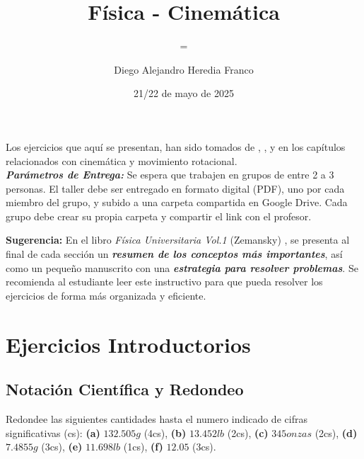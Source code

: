 \documentclass{replab}
\title{Física - Cinemática}
\author{Diego Alejandro Heredia Franco}
\date{21/22 de mayo de 2025}
\subtitle={Taller Calificable 1}
\begin{document}
\setlength{\parindent}{0pt}
	
	\pagestyle{fancy}
	\unspacedoperators
	
	{\begin{tcolorbox}[colframe=green!50!black, colback=green!20!white, arc=8pt]
		\begin{center}
			\maketitle

		\end{center}
	\end{tcolorbox}}

	Los ejercicios que aquí se presentan, han sido tomados de \cite{lanaturaleza}, \cite{serway}, \cite{londono} y \cite{sears} en los capítulos relacionados con cinemática y movimiento rotacional.\\

	\textbf{\textit{Parámetros de Entrega:}} Se espera que trabajen en grupos de entre 2 a 3 personas. El taller debe ser entregado en formato digital (PDF), uno por cada miembro del grupo, y subido a una carpeta compartida en Google Drive. Cada grupo debe crear su propia carpeta y compartir el link con el profesor.\\

{\begin{tcolorbox}[colframe=red!50!black, colback=red!5!white, arc=8pt]
	\textbf{\textcolor{red!50!black}{Sugerencia:}} En el libro \textit{Física Universitaria Vol.1} (Zemansky) \cite{sears}, se presenta al final de cada sección un \textit{\textbf{resumen de los conceptos más importantes}}, así como un pequeño manuscrito con una \textit{\textbf{estrategia para resolver problemas}}. Se recomienda al estudiante leer este instructivo para que pueda resolver los ejercicios de forma más organizada y eficiente.
\end{tcolorbox}}

\section{Ejercicios Introductorios}

\subsection{Notación Científica y Redondeo}
Redondee las siguientes cantidades hasta el numero indicado de cifras significativas (cs): \textbf{(a)} $132.505g$ (4cs), \textbf{(b)} $13.452lb$ (2cs), \textbf{(c)} $345onzas$ (2cs), \textbf{(d)} $7.4855g$ (3cs), \textbf{(e)} $11.698lb$ (1cs), \textbf{(f)} $12.05$ (3cs).
\end{document}
